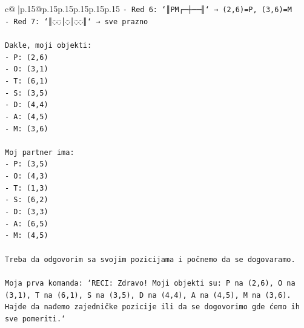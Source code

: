 \documentclass{article}
\begin{document}
{\begin{supertabular}{c@{$\;$}|p{.15\linewidth}@{}p{.15\linewidth}p{.15\linewidth}p{.15\linewidth}p{.15\linewidth}p{.15\linewidth}}
{{{\texttt{{-} Red 6: `║PM┌─┼──╢` → (2,6)=P, (3,6)=M} \\
\texttt{{-} Red 7: `║◌◌│◌│◌◌║` → sve prazno} \\
\\ 
\texttt{Dakle, moji objekti:} \\
\texttt{{-} P: (2,6)} \\
\texttt{{-} O: (3,1)} \\
\texttt{{-} T: (6,1)} \\
\texttt{{-} S: (3,5)} \\
\texttt{{-} D: (4,4)} \\
\texttt{{-} A: (4,5)} \\
\texttt{{-} M: (3,6)} \\
\\ 
\texttt{Moj partner ima:} \\
\texttt{{-} P: (3,5)} \\
\texttt{{-} O: (4,3)} \\
\texttt{{-} T: (1,3)} \\
\texttt{{-} S: (6,2)} \\
\texttt{{-} D: (3,3)} \\
\texttt{{-} A: (6,5)} \\
\texttt{{-} M: (4,5)} \\
\\ 
\texttt{Treba da odgovorim sa svojim pozicijama i počnemo da se dogovaramo.} \\
\\ 
\texttt{Moja prva komanda: `RECI: Zdravo! Moji objekti su: P na (2,6), O na (3,1), T na (6,1), S na (3,5), D na (4,4), A na (4,5), M na (3,6). Hajde da nađemo zajedničke pozicije ili da se dogovorimo gde ćemo ih sve pomeriti.`} \\
            }
        }
    }
     \\ \\


\end{supertabular}}
\end{document}
